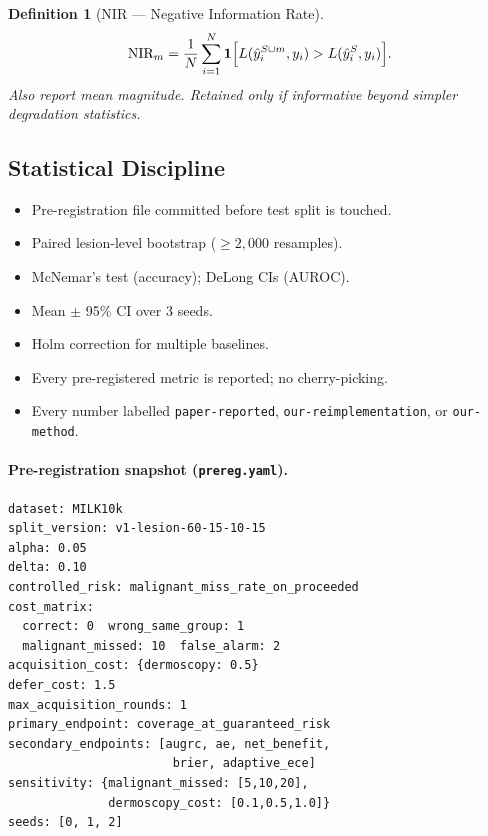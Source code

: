 \documentclass[conference]{IEEEtran}
\newtheorem{definition}{Definition}
\newcommand{\1}{\mathbf{1}}
\begin{document}
\begin{definition}[NIR --- Negative Information Rate]
\begin{equation}
  \text{NIR}_m = \frac{1}{N}\sum_{i=1}^N
    \mathbf{1}\Bigl[L(\hat{y}_i^{S \cup m}, y_i) > L(\hat{y}_i^{S}, y_i)\Bigr].
  \label{eq:nir}
\end{equation}
Also report mean magnitude. Retained only if informative beyond simpler
degradation statistics.
\end{definition}

\subsection{Statistical Discipline}

\begin{itemize}[leftmargin=*]
  \item Pre-registration file committed before test split is touched.
  \item Paired lesion-level bootstrap ($\geq 2{,}000$ resamples).
  \item McNemar's test (accuracy); DeLong CIs (AUROC).
  \item Mean $\pm$ 95\% CI over 3 seeds.
  \item Holm correction for multiple baselines.
  \item Every pre-registered metric is reported; no cherry-picking.
  \item Every number labelled \texttt{paper-reported},
        \texttt{our-reimplementation}, or \texttt{our-method}.
\end{itemize}

\paragraph{Pre-registration snapshot (\texttt{prereg.yaml}).}
\begin{small}
\begin{verbatim}
dataset: MILK10k
split_version: v1-lesion-60-15-10-15
alpha: 0.05
delta: 0.10
controlled_risk: malignant_miss_rate_on_proceeded
cost_matrix:
  correct: 0  wrong_same_group: 1
  malignant_missed: 10  false_alarm: 2
acquisition_cost: {dermoscopy: 0.5}
defer_cost: 1.5
max_acquisition_rounds: 1
primary_endpoint: coverage_at_guaranteed_risk
secondary_endpoints: [augrc, ae, net_benefit,
                       brier, adaptive_ece]
sensitivity: {malignant_missed: [5,10,20],
              dermoscopy_cost: [0.1,0.5,1.0]}
seeds: [0, 1, 2]
\end{verbatim}
\end{small}
\end{document}
